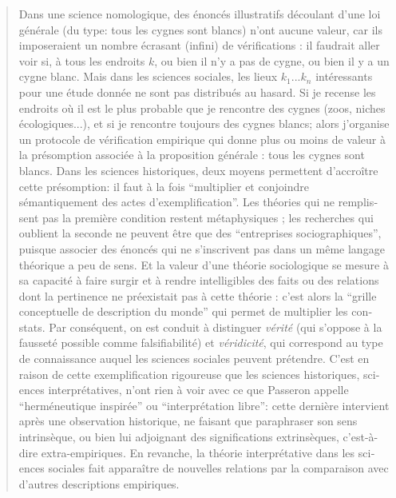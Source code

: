 \foreignblockquote{english}[\cite{Allard2000}]{Dans une science nomologique, des énoncés illustratifs découlant d’une loi générale (du type: tous les cygnes sont blancs) n’ont aucune valeur, car ils imposeraient un nombre écrasant (infini) de vérifications : il faudrait aller voir si, à tous les endroits $k$, ou bien il n’y a pas de cygne, ou bien il y a un cygne blanc. Mais dans les sciences sociales, les lieux $k_1 ... k_n$ intéressants pour une étude donnée ne sont pas distribués au hasard. Si je recense les endroits où il est le plus probable que je rencontre des cygnes (zoos, niches écologiques...), et si je rencontre toujours des cygnes blancs; alors j’organise un protocole de vérification empirique qui donne plus ou moins de valeur à la présomption associée à la proposition générale : tous les cygnes sont blancs. Dans les sciences historiques, deux moyens permettent d’accroître cette présomption: il faut à la fois \enquote{multiplier et conjoindre sémantiquement des actes d’exemplification}. Les théories qui ne remplissent pas la première condition restent métaphysiques ; les recherches qui oublient la seconde ne peuvent être que des \enquote{entreprises sociographiques}, puisque associer des énoncés qui ne s’inscrivent pas dans un même langage théorique a peu de sens. Et la valeur d’une théorie sociologique se mesure à sa capacité à faire surgir et à rendre intelligibles des faits ou des relations dont la pertinence ne préexistait pas à cette théorie : c’est alors la \enquote{grille conceptuelle de description du monde} qui permet de multiplier les constats. Par conséquent, on est conduit à distinguer \textit{vérité} (qui s’oppose à la fausseté possible comme falsifiabilité) et \textit{véridicité}, qui correspond au type de connaissance auquel les sciences sociales peuvent prétendre. C’est en raison de cette exemplification rigoureuse que les sciences historiques, sciences interprétatives, n’ont rien à voir avec ce que Passeron appelle \enquote{herméneutique inspirée} ou \enquote{interprétation libre}: cette dernière intervient après une observation historique, ne faisant que paraphraser son sens intrinsèque, ou bien lui adjoignant des significations extrinsèques, c’est-à-dire extra-empiriques. En revanche, la théorie interprétative dans les sciences sociales fait apparaître de nouvelles relations par la comparaison avec d’autres descriptions empiriques.}


